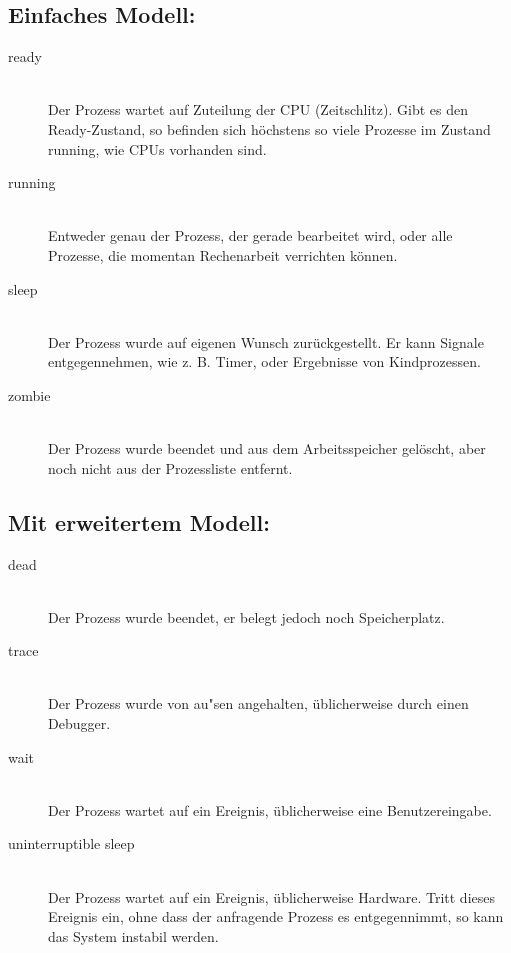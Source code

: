\begin{answer}
  \subsection*{Einfaches Modell:}

  \begin{description}
  \item[ready]\hfill \\ Der Prozess wartet auf Zuteilung der CPU (Zeitschlitz). Gibt es den Ready-Zustand, so befinden sich höchstens so viele Prozesse im Zustand running, wie CPUs vorhanden sind.

  \item[running]\hfill \\ Entweder genau der Prozess, der gerade bearbeitet wird, oder alle Prozesse, die momentan Rechenarbeit verrichten können.

  \item[sleep]\hfill \\ Der Prozess wurde auf eigenen Wunsch zurückgestellt. Er kann Signale entgegennehmen, wie z. B. Timer, oder Ergebnisse von Kindprozessen.

  \item[zombie]\hfill \\ Der Prozess wurde beendet und aus dem Arbeitsspeicher gelöscht, aber noch nicht aus der Prozessliste entfernt.
  \end{description}
  
  \subsection*{Mit erweitertem Modell:}
\begin{description}

  \item[dead]\hfill \\ Der Prozess wurde beendet, er belegt jedoch noch Speicherplatz.

  \item[trace]\hfill \\ Der Prozess wurde von au"sen angehalten, üblicherweise durch einen Debugger.

  \item[wait]\hfill \\ Der Prozess wartet auf ein Ereignis, üblicherweise eine Benutzereingabe.

  \item[uninterruptible sleep]\hfill \\ Der Prozess wartet auf ein Ereignis, üblicherweise Hardware. Tritt dieses Ereignis ein, ohne dass der anfragende Prozess es entgegennimmt, so kann das System instabil werden.
  \end{description}

\end{answer}

